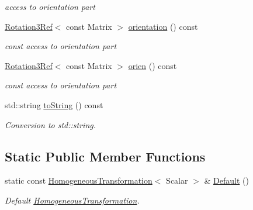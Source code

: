 \begin{DoxyCompactItemize}
\begin{DoxyCompactList}\small\item\em access to orientation part \end{DoxyCompactList}\item 
\hyperlink{classow__core_1_1Rotation3Ref}{Rotation3\+Ref}$<$ const Matrix $>$ \hyperlink{classow__core_1_1HomogeneousTransformation_ab2dcd67527042fd99a7f47f539497cb8}{orientation} () const \hypertarget{classow__core_1_1HomogeneousTransformation_ab2dcd67527042fd99a7f47f539497cb8}{}\label{classow__core_1_1HomogeneousTransformation_ab2dcd67527042fd99a7f47f539497cb8}

\begin{DoxyCompactList}\small\item\em const access to orientation part \end{DoxyCompactList}\item 
\hyperlink{classow__core_1_1Rotation3Ref}{Rotation3\+Ref}$<$ const Matrix $>$ \hyperlink{classow__core_1_1HomogeneousTransformation_aeb546b777add6abf0c24d012f416ce50}{orien} () const \hypertarget{classow__core_1_1HomogeneousTransformation_aeb546b777add6abf0c24d012f416ce50}{}\label{classow__core_1_1HomogeneousTransformation_aeb546b777add6abf0c24d012f416ce50}

\begin{DoxyCompactList}\small\item\em const access to orientation part \end{DoxyCompactList}\item 
std\+::string \hyperlink{classow__core_1_1HomogeneousTransformation_a81377744bf29c6001680abdcd0f22f95}{to\+String} () const \hypertarget{classow__core_1_1HomogeneousTransformation_a81377744bf29c6001680abdcd0f22f95}{}\label{classow__core_1_1HomogeneousTransformation_a81377744bf29c6001680abdcd0f22f95}

\begin{DoxyCompactList}\small\item\em Conversion to std\+::string. \end{DoxyCompactList}\end{DoxyCompactItemize}
\subsection*{Static Public Member Functions}
\begin{DoxyCompactItemize}
\item 
static const \hyperlink{classow__core_1_1HomogeneousTransformation}{Homogeneous\+Transformation}$<$ Scalar $>$ \& \hyperlink{classow__core_1_1HomogeneousTransformation_a7113d1a0875f4c8583321a7f3aeb7740}{Default} ()
\begin{DoxyCompactList}\small\item\em Default \hyperlink{classow__core_1_1HomogeneousTransformation}{Homogeneous\+Transformation}. \end{DoxyCompactList}\end{DoxyCompactItemize}


